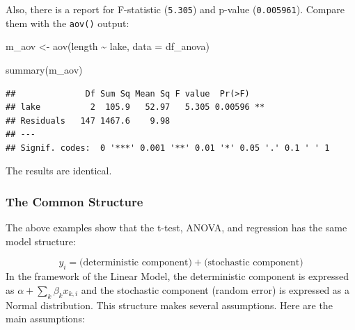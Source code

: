 \documentclass[
]{article}
\newenvironment{Shaded}{\begin{snugshade}}{\end{snugshade}}
\newcommand{\AttributeTok}[1]{\textcolor[rgb]{0.77,0.63,0.00}{#1}}
\newcommand{\FunctionTok}[1]{\textcolor[rgb]{0.00,0.00,0.00}{#1}}
\newcommand{\NormalTok}[1]{#1}
\newcommand{\OtherTok}[1]{\textcolor[rgb]{0.56,0.35,0.01}{#1}}
\newcommand{\SpecialCharTok}[1]{\textcolor[rgb]{0.00,0.00,0.00}{#1}}
\begin{document}
Also, there is a report for F-statistic (\texttt{5.305}) and p-value (\texttt{0.005961}). Compare them with the \texttt{aov()} output:

\begin{Shaded}
\begin{Highlighting}[]
\NormalTok{m\_aov }\OtherTok{\textless{}{-}} \FunctionTok{aov}\NormalTok{(length }\SpecialCharTok{\textasciitilde{}}\NormalTok{ lake,}
             \AttributeTok{data =}\NormalTok{ df\_anova)}

\FunctionTok{summary}\NormalTok{(m\_aov)}
\end{Highlighting}
\end{Shaded}

\begin{verbatim}
##              Df Sum Sq Mean Sq F value  Pr(>F)   
## lake          2  105.9   52.97   5.305 0.00596 **
## Residuals   147 1467.6    9.98                   
## ---
## Signif. codes:  0 '***' 0.001 '**' 0.01 '*' 0.05 '.' 0.1 ' ' 1
\end{verbatim}

The results are identical.

\hypertarget{the-common-structure}{%
\subsubsection{The Common Structure}\label{the-common-structure}}

The above examples show that the t-test, ANOVA, and regression has the same model structure:

\[
y_i = \text{(deterministic component)} + \text{(stochastic component)}
\] In the framework of the Linear Model, the deterministic component is expressed as \(\alpha + \sum_k \beta_k x_{k,i}\) and the stochastic component (random error) is expressed as a Normal distribution. This structure makes several assumptions. Here are the main assumptions:
\end{document}
